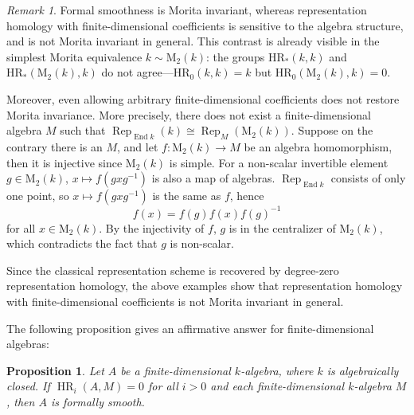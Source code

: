 \documentclass{article}
\numberwithin{equation}{section} %
\theoremstyle{plain}
\newtheorem{proposition}[theorem]{Proposition}
\theoremstyle{definition}
\theoremstyle{remark}
\newtheorem{remark}{Remark}
\begin{document}
\begin{remark}
Formal smoothness is Morita invariant, whereas representation homology with finite-dimensional coefficients is sensitive to the algebra structure, and is not Morita invariant in general.
This contrast is already visible in the simplest Morita equivalence $k\sim\mathrm{M}_2(k)$: the groups $\mathrm{HR}_*(k,k)$ and $\mathrm{HR}_*(\mathrm{M}_2(k),k)$ do not agree---$\mathrm{HR}_0(k,k)=k$ but $\mathrm{HR}_0(\mathrm{M}_2(k),k)=0$.

Moreover, even allowing arbitrary finite-dimensional coefficients does not restore Morita invariance.
More precisely, there does not exist a finite-dimensional algebra $M$ such that $\operatorname{Rep}_{\operatorname{End}k}(k)\cong\operatorname{Rep}_M(\mathrm{M}_2(k))$.
Suppose on the contrary there is an $M$, and let $f:\mathrm{M}_2(k)\to M$ be an algebra homomorphism, then it is injective since $\mathrm{M}_2(k)$ is simple.
For a non-scalar invertible element $g\in\mathrm{M}_2(k)$, $x\mapsto f(gxg^{-1})$ is also a map of algebras.
$\operatorname{Rep}_{\operatorname{End}k}$ consists of only one point, so $x\mapsto f(gxg^{-1})$ is the same as $f$, hence
\begin{equation*}
f(x)=f(g)f(x)f(g)^{-1}
\end{equation*}
for all $x\in\mathrm{M}_2(k)$.
By the injectivity of $f$, $g$ is in the centralizer of $\mathrm{M}_2(k)$, which contradicts the fact that $g$ is non-scalar.

Since the classical representation scheme is recovered by degree-zero representation homology, the above examples show that representation homology with finite-dimensional coefficients is not Morita invariant in general.
\end{remark}

The following proposition gives an affirmative answer for finite-dimensional algebras:

\begin{proposition}\label{Prop_FinDimAlg}
Let $A$ be a finite-dimensional $k$-algebra, where $k$ is algebraically closed.
If $\operatorname{HR}_i(A,M)=0$ for all $i>0$ and each finite-dimensional $k$-algebra $M$, then $A$ is formally smooth.
\end{proposition}
\end{document}
